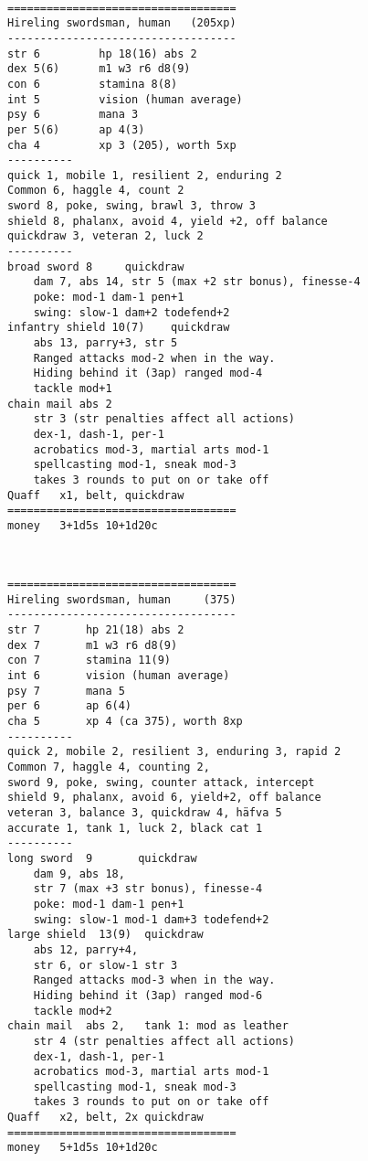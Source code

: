 \

\goodbreak \begin{samepage} \small \begin{verbatim}
===================================
Hireling swordsman, human   (205xp)
-----------------------------------
str	6         hp 18(16) abs 2
dex	5(6)      m1 w3 r6 d8(9)
con	6         stamina 8(8)
int 5         vision (human average)
psy	6         mana 3
per	5(6)      ap 4(3)
cha	4         xp 3 (205), worth 5xp
----------
quick 1, mobile 1, resilient 2, enduring 2
Common 6, haggle 4, count 2
sword 8, poke, swing, brawl 3, throw 3
shield 8, phalanx, avoid 4, yield +2, off balance
quickdraw 3, veteran 2, luck 2
----------
broad sword	8     quickdraw
    dam 7, abs 14, str 5 (max +2 str bonus), finesse-4
    poke: mod-1 dam-1 pen+1
    swing: slow-1 dam+2 todefend+2
infantry shield	10(7)    quickdraw
    abs 13, parry+3, str 5
    Ranged attacks mod-2 when in the way.
    Hiding behind it (3ap) ranged mod-4
    tackle mod+1
chain mail abs 2
    str 3 (str penalties affect all actions)
    dex-1, dash-1, per-1
    acrobatics mod-3, martial arts mod-1
    spellcasting mod-1, sneak mod-3
    takes 3 rounds to put on or take off
Quaff	x1, belt, quickdraw
===================================
money	3+1d5s 10+1d20c
\end{verbatim} \normalsize \end{samepage}

\

\goodbreak \begin{samepage} \small \begin{verbatim}
===================================
Hireling swordsman, human     (375)
-----------------------------------
str	7       hp 21(18) abs 2
dex	7       m1 w3 r6 d8(9)
con	7       stamina 11(9)
int 6       vision (human average)
psy	7       mana 5
per	6       ap 6(4)
cha	5       xp 4 (ca 375), worth 8xp
----------
quick 2, mobile 2, resilient 3, enduring 3, rapid 2
Common 7, haggle 4, counting 2,
sword 9, poke, swing, counter attack, intercept
shield 9, phalanx, avoid 6, yield+2, off balance
veteran 3, balance 3, quickdraw 4, häfva 5
accurate 1, tank 1, luck 2, black cat 1
----------
long sword  9       quickdraw
    dam 9, abs 18,
    str 7 (max +3 str bonus), finesse-4
    poke: mod-1 dam-1 pen+1
    swing: slow-1 mod-1 dam+3 todefend+2
large shield  13(9)  quickdraw
    abs 12, parry+4,
    str 6, or slow-1 str 3
    Ranged attacks mod-3 when in the way.
    Hiding behind it (3ap) ranged mod-6
    tackle mod+2
chain mail  abs 2,   tank 1: mod as leather
    str 4 (str penalties affect all actions)
    dex-1, dash-1, per-1
    acrobatics mod-3, martial arts mod-1
    spellcasting mod-1, sneak mod-3
    takes 3 rounds to put on or take off
Quaff	x2, belt, 2x quickdraw
===================================
money	5+1d5s 10+1d20c
\end{verbatim} \normalsize \end{samepage}

